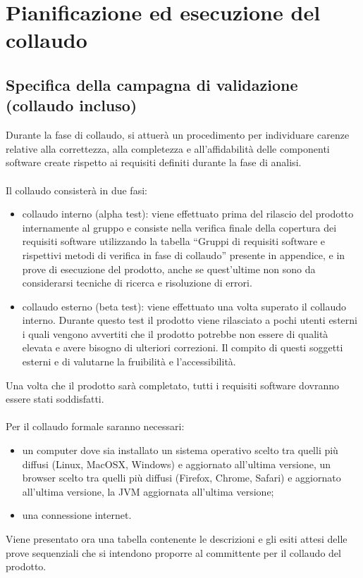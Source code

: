 
\chapter{Pianificazione ed esecuzione del \\collaudo}
\thispagestyle{fancy} %

\section{Specifica della campagna di validazione \\(collaudo incluso)}
Durante la fase di collaudo, si attuer\`a un procedimento per individuare carenze
relative alla correttezza, alla completezza e all'affidabilit\`a delle componenti 
software create rispetto ai requisiti definiti durante la fase di analisi.\\ \\
Il collaudo consister\`a in due fasi: 

\begin{itemize}
  \item collaudo interno (alpha test): viene effettuato prima del rilascio
  del prodotto internamente al gruppo e consiste nella verifica finale della
  copertura dei requisiti software utilizzando la tabella ``Gruppi di
  requisiti software e rispettivi metodi di verifica in fase di collaudo''
  presente in appendice, e in
  prove di esecuzione del prodotto, anche se quest'ultime non sono da
  considerarsi tecniche di ricerca e risoluzione di errori.
  \item collaudo esterno (beta test): viene effettuato una volta superato il
  collaudo interno. Durante questo test il prodotto viene rilasciato a
  pochi utenti esterni i quali vengono avvertiti che il prodotto potrebbe non essere 
  di qualit\`a elevata e avere bisogno di ulteriori correzioni. 
  Il compito di questi soggetti esterni e di valutarne la fruibilit\`a e l'accessibilit\`a.
\end{itemize}

Una volta che il prodotto sar\`a completato, tutti i requisiti software dovranno
essere stati soddisfatti.
\\\\
Per il collaudo formale saranno necessari:
\begin{itemize}
  \item un computer dove sia installato un sistema operativo scelto tra quelli
  pi\`u diffusi (Linux, MacOSX, Windows) e aggiornato all'ultima versione, un
  browser scelto tra quelli pi\`u diffusi (Firefox, Chrome, Safari) e aggiornato
  all'ultima versione, la JVM aggiornata all'ultima versione;
  \item una connessione internet.
\end{itemize}
Viene presentato ora una tabella contenente le descrizioni e gli esiti attesi
delle prove sequenziali che si intendono proporre al committente per il collaudo del
prodotto.
\\

